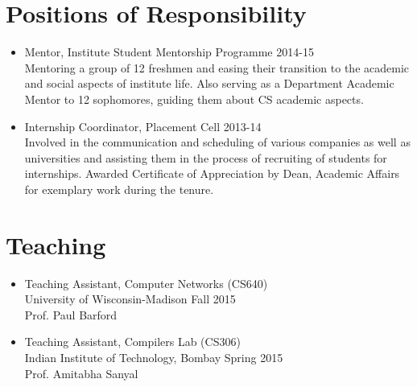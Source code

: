 \documentclass[11pt,a4paper,sans]{moderncv}        %
\begin{document}
\section{Positions of Responsibility}
\begin{itemize}
\item Mentor, Institute Student Mentorship Programme \hfill 2014-15 \\
Mentoring a group of 12 freshmen and easing their transition to the academic and social aspects of institute life. Also serving as a Department Academic Mentor to 12 sophomores, guiding them about CS academic aspects.

\item Internship Coordinator, Placement Cell \hfill 2013-14 \\
Involved in the communication and scheduling of various companies as well as universities and assisting them in the process of recruiting of students for internships. Awarded Certificate of Appreciation by Dean, Academic Affairs for exemplary work during the tenure.

\end{itemize}

\section{Teaching}
\begin{itemize}
	\item Teaching Assistant, Computer Networks (CS640) \\
	University of Wisconsin-Madison \hfill Fall 2015 \\
	Prof. Paul Barford
	
	\item Teaching Assistant, Compilers Lab (CS306) \\
	Indian Institute of Technology, Bombay \hfill Spring 2015 \\
	Prof. Amitabha Sanyal
\end{itemize}


%


\end{document}
